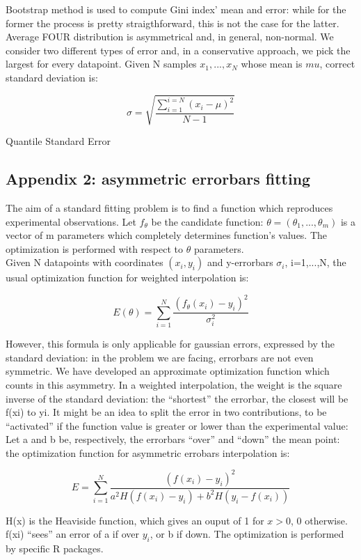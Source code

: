 Bootstrap method is used to compute Gini index' mean and error: while for the former the process is pretty straigthforward, this is not the case for the latter.
Average FOUR distribution is asymmetrical and, in general, non-normal. We consider two different types of error  and, in a conservative approach, we pick the largest for every datapoint.
Given N samples ${x_1,...,x_N}$ whose mean is $mu$, correct standard deviation is: 
 
$$
\sigma=\sqrt{\frac{\sum_{i=1}^{i=N}(x_i - \mu)^2}{N-1}}
$$


Quantile Standard Error 





\subsection{Appendix 2: asymmetric errorbars fitting}
The aim of a standard fitting problem is to find a function which reproduces experimental observations.
Let $f_{\theta}$ be the candidate function: $\theta=(\theta_1,...,\theta_m)$ is a vector of m parameters which completely determines function's values.
The optimization is performed with respect to $\theta$ parameters.\\
Given N datapoints with coordinates ${(x_i,y_i)}$ and y-errorbars $\sigma_i$, i=1,...,N, the usual optimization function for weighted interpolation is:

$$
E(\theta)= \sum_{i=1}^{N} \frac{(f_{\theta}(x_i)-y_i)^2}{\sigma_{i}^2}
$$


However, this formula is only applicable for gaussian errors, expressed by the standard deviation: in the problem we are facing, errorbars are not even symmetric.
We have developed an approximate optimization function which counts in this asymmetry.
In a weighted interpolation, the weight is the square inverse of the standard deviation: the ``shortest'' the errorbar, the closest will be f(xi) to yi.
It might be an idea to split the error in two contributions, to be ``activated'' if the function value is greater or lower than the experimental value:
Let a and b be, respectively, the errorbars ``over'' and ``down'' the mean point: the optimization function for asymmetric errobars interpolation is:

$$
E= \sum_{i=1}^{N} \frac{(f(x_i)-y_i)^2}{a^{2}H(f(x_i)-y_i)+b^{2}H(y_i-f(x_i))}
$$

H(x) is the Heaviside function, which gives an ouput of 1 for $x>0$, 0 otherwise.\\
f(xi) ``sees'' an error of a if over $y_i$, or b if down.
The optimization is performed by specific R packages.


 





 